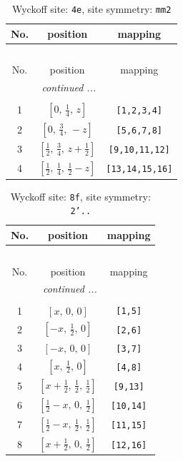 \documentclass[fleqn,8pt]{jsarticle}
\begin{document}
\renewcommand{\arraystretch}{1.2}
\begin{longtable}{ccc}
\caption{Wyckoff site: {\tt 4e}, site symmetry: {\tt mm2}}
 \\
 \hline \hline
No. & position & mapping \\ \hline \endfirsthead

\multicolumn{2}{l}{\tablename\ \thetable{}} \\
 \hline \hline
No. & position & mapping \\ \hline \endhead

 \hline \hline
\multicolumn{2}{r}{\footnotesize\it continued ...} \\ \endfoot

 \hline \hline
\multicolumn{2}{r}{} \\ \endlastfoot

1 & $\left[ 0,\, \frac{1}{4},\, z \right]$ & {\tt [1,2,3,4]} \\ \hline
2 & $\left[ 0,\, \frac{3}{4},\, - z \right]$ & {\tt [5,6,7,8]} \\ \hline
3 & $\left[ \frac{1}{2},\, \frac{3}{4},\, z + \frac{1}{2} \right]$ & {\tt [9,10,11,12]} \\ \hline
4 & $\left[ \frac{1}{2},\, \frac{1}{4},\, \frac{1}{2} - z \right]$ & {\tt [13,14,15,16]} \\
\end{longtable}
\renewcommand{\arraystretch}{1.2}
\begin{longtable}{ccc}
\caption{Wyckoff site: {\tt 8f}, site symmetry: {\tt 2'..}}
 \\
 \hline \hline
No. & position & mapping \\ \hline \endfirsthead

\multicolumn{2}{l}{\tablename\ \thetable{}} \\
 \hline \hline
No. & position & mapping \\ \hline \endhead

 \hline \hline
\multicolumn{2}{r}{\footnotesize\it continued ...} \\ \endfoot

 \hline \hline
\multicolumn{2}{r}{} \\ \endlastfoot

1 & $\left[ x,\, 0,\, 0 \right]$ & {\tt [1,5]} \\ \hline
2 & $\left[ - x,\, \frac{1}{2},\, 0 \right]$ & {\tt [2,6]} \\ \hline
3 & $\left[ - x,\, 0,\, 0 \right]$ & {\tt [3,7]} \\ \hline
4 & $\left[ x,\, \frac{1}{2},\, 0 \right]$ & {\tt [4,8]} \\ \hline
5 & $\left[ x + \frac{1}{2},\, \frac{1}{2},\, \frac{1}{2} \right]$ & {\tt [9,13]} \\ \hline
6 & $\left[ \frac{1}{2} - x,\, 0,\, \frac{1}{2} \right]$ & {\tt [10,14]} \\ \hline
7 & $\left[ \frac{1}{2} - x,\, \frac{1}{2},\, \frac{1}{2} \right]$ & {\tt [11,15]} \\ \hline
8 & $\left[ x + \frac{1}{2},\, 0,\, \frac{1}{2} \right]$ & {\tt [12,16]} \\
\end{longtable}
\end{document}
